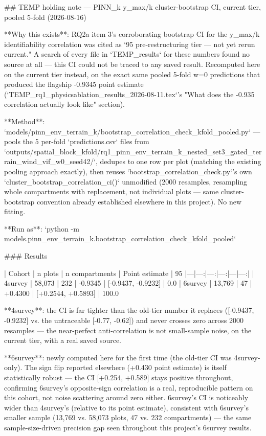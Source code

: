 ## TEMP holding note — PINN_k y_max/k cluster-bootstrap CI, current tier, pooled 5-fold (2026-08-16)

**Why this exists**: RQ2a item 3's corroborating bootstrap CI for the y_max/k identifiability
correlation was cited as `95%
pre-restructuring tier — not yet rerun current." A search of every file in `TEMP_results` for
these numbers found no source at all — this CI could not be traced to any saved result. Recomputed
here on the current tier instead, on the exact same pooled 5-fold w=0 predictions that produced the
flagship -0.9345 point estimate (`TEMP_rq1_physicsablation_results_2026-08-11.tex`'s "What does the
-0.935 correlation actually look like" section).

**Method**: `models/pinn_env_terrain_k/bootstrap_correlation_check_kfold_pooled.py` — pools the 5
per-fold `predictions.csv` files from
`outputs/spatial_block_kfold/rq1_pinn_env_terrain_k_nested_set3_gated_terrain_wind_vif_w0_seed42/`,
dedupes to one row per plot (matching the existing pooling approach exactly), then reuses
`bootstrap_correlation_check.py`'s own `cluster_bootstrap_correlation_ci()` unmodified (2000
resamples, resampling whole compartments with replacement, not individual plots — same
cluster-bootstrap convention already established elsewhere in this project). No new fitting.

**Run as**: `python -m models.pinn_env_terrain_k.bootstrap_correlation_check_kfold_pooled`

### Results

| Cohort | n plots | n compartments | Point estimate | 95%
|---|---:|---:|---:|---|---:|
| 4survey | 58,073 | 232 | -0.9345 | [-0.9437, -0.9232] | 0.0%
| 6survey | 13,769 | 47 | +0.4300 | [+0.2544, +0.5893] | 100.0%

**4survey**: the CI is far tighter than the old-tier number it replaces ([-0.9437, -0.9232] vs. the
untraceable [-0.77, -0.62]) and never crosses zero across 2000 resamples — the near-perfect
anti-correlation is not small-sample noise, on the current tier, with a real saved source.

**6survey**: newly computed here for the first time (the old-tier CI was 4survey-only). The sign
flip reported elsewhere (+0.430 point estimate) is itself statistically robust — the CI
[+0.254, +0.589] stays positive throughout, confirming 6survey's opposite-sign correlation is a
real, reproducible pattern on this cohort, not noise scattering around zero either. 6survey's CI is
noticeably wider than 4survey's (relative to its point estimate), consistent with 6survey's smaller
sample (13,769 vs. 58,073 plots, 47 vs. 232 compartments) — the same sample-size-driven precision
gap seen throughout this project's 6survey results.
